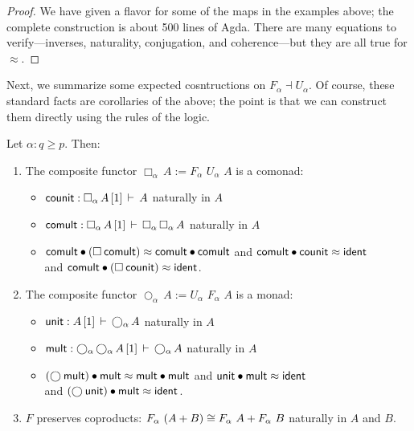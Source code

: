 \documentclass{drl-common/llncs}
\newcommand{\la}{\ensuremath{\dashv}}
\newcommand\F[2]{\ensuremath{F_{#1} \,\, #2}}
\newcommand\U[2]{\ensuremath{U_{#1} \,\, #2}}
\newcommand\coprd[2]{\ensuremath{#1 + #2}}
\newcommand\seq[3]{\ensuremath{#1 \, [ #2 ] \, \vdash \, #3}}
\newcommand\ident[1]{\ensuremath{\dsd{ident}_{#1}}}
\newcommand\cuti{\ensuremath{\bullet}}
\newcommand\ap[2]{\ensuremath{#1 \approx #2}}
\newcommand\Bx[2]{\ensuremath{\Box_{#1} \, {#2}}}
\newcommand\Crc[2]{\ensuremath{\bigcirc_{#1} \, {#2}}}
\begin{document}
\begin{proof}
We have given a flavor for some of the maps in the examples above; the
complete construction is about 500 lines of Agda.  There are many
equations to verify---inverses, naturality, conjugation, and
coherence---but they are all true for \ap{}{}.
\end{proof}

Next, we summarize some expected cosntructions on $F_\alpha \la
U_\alpha$.  Of course, these standard facts are corollaries of the
above; the point is that we can construct them directly using the rules of the logic.

\begin{lemma} \label{lem:constructionsonadjunctions}
Let $\alpha : q \ge p$.  Then:
\begin{enumerate}
\item The composite functor $\Bx{\alpha}{A} := \F{\alpha}{\U{\alpha}{A}}$ is a comonad:
\begin{itemize}
\item[] $\dsd{counit} : \seq{\Bx \alpha A}{1}{A}$ naturally in $A$
\item[] $\dsd{comult} : \seq{\Bx \alpha A}{1}{\Bx \alpha {\Bx \alpha A}}$
  naturally in $A$
\item[] 
 \ap{\dsd{comult} \cuti (\Bx{}{\dsd{comult}})}{\dsd{comult} \cuti
   \dsd{comult}}
and \ap{\dsd{comult} \cuti \dsd{counit}}{\ident{}} \\
and \ap{\dsd{comult} \cuti (\Bx{}{\dsd{counit}})}{\ident{}}.  
\end{itemize}

\item The composite functor $\Crc{\alpha}{A} := \U{\alpha}{\F{\alpha}{A}}$ is a monad:
\begin{itemize}
\item[] $\dsd{unit} : \seq{A}{1}{\Crc \alpha A}$ naturally in $A$
\item[] $\dsd{mult} : \seq{\Crc \alpha {\Crc \alpha A}}{1}{\Crc \alpha A}$
  naturally in $A$
\item[] 
 \ap{(\Crc{}{\dsd{mult}}) \cuti \dsd{mult} }{\dsd{mult} \cuti
   \dsd{mult}}
and \ap{\dsd{unit} \cuti \dsd{mult}}{\ident{}} \\
and \ap{(\Crc{}{\dsd{unit}}) \cuti \dsd{mult}}{\ident{}}.  
\end{itemize}

\item $F$ preserves coproducts: $\F \alpha (\coprd A B) \iso \coprd {\F
  \alpha A} {\F \alpha B}$ naturally in $A$ and $B$.
\end{enumerate}
\end{lemma}
\end{document}
